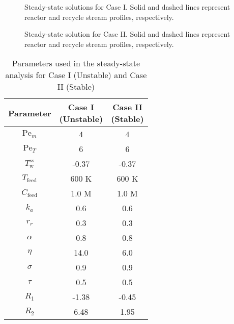 \begin{figure}[!htbp]
    \centering
    
    \caption{Steady-state solutions for Case I. Solid and dashed lines represent reactor and recycle stream profiles, respectively.}
    \label{fig:ss_profiles}
\end{figure}

\begin{figure}[!htbp]
    \centering
    
    \caption{Steady-state solution for Case II. Solid and dashed lines represent reactor and recycle stream profiles, respectively.}
    \label{fig:ss_profiles_stable}
\end{figure}

\begin{table}[htbp]
\centering
\renewcommand{\arraystretch}{1.3}
\caption{Parameters used in the steady-state analysis for Case I (Unstable) and Case II (Stable)} \label{tab:pars}
\begin{tabular}{|c|c|c|}
\hline
\textbf{Parameter} & \makecell{\textbf{Case I} \\ \textbf{(Unstable)}} & \makecell{\textbf{Case II} \\ \textbf{(Stable)}} \\
\hline
$\mathrm{Pe}_m$  & 4        & 4      \\
$\mathrm{Pe}_T$  & 6        & 6      \\
$T_{\mathrm{w}}^{\mathrm{ss}}$ & -0.37 & -0.37  \\
$T_{\mathrm{feed}}$ & 600 K & 600 K  \\
$C_{\mathrm{feed}}$ & 1.0 M & 1.0 M  \\
$k_a$            & 0.6      & 0.6    \\
$r_r$            & 0.3      & 0.3    \\
$\alpha$         & 0.8      & 0.8    \\
$\eta$           & 14.0     & 6.0    \\
$\sigma$         & 0.9      & 0.9    \\
$\tau$           & 0.5      & 0.5    \\
$R_1$            & -1.38    & -0.45  \\
$R_2$            & 6.48     & 1.95   \\
\hline
\end{tabular}
\end{table}


